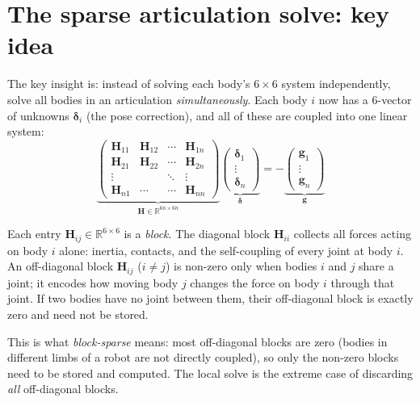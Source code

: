 \documentclass[11pt,a4paper]{article}
\begin{document}
\section{The sparse articulation solve: key idea}

The key insight is: instead of solving each body's $6\times 6$ system
independently, solve all bodies in an articulation \emph{simultaneously}.
Each body $i$ now has a $6$-vector of unknowns $\boldsymbol{\delta}_i$
(the pose correction), and all of these are coupled into one linear system:
\begin{equation}
  \underbrace{\begin{pmatrix}
    \mathbf{H}_{11} & \mathbf{H}_{12} & \cdots & \mathbf{H}_{1n} \\
    \mathbf{H}_{21} & \mathbf{H}_{22} & \cdots & \mathbf{H}_{2n} \\
    \vdots          &                 & \ddots & \vdots          \\
    \mathbf{H}_{n1} & \cdots          & \cdots & \mathbf{H}_{nn}
  \end{pmatrix}}_{\mathbf{H} \in \mathbb{R}^{6n \times 6n}}
  \underbrace{\begin{pmatrix} \boldsymbol{\delta}_1 \\ \vdots \\
  \boldsymbol{\delta}_n \end{pmatrix}}_{\boldsymbol{\delta}}
  =
  -\underbrace{\begin{pmatrix} \mathbf{g}_1 \\ \vdots \\
  \mathbf{g}_n \end{pmatrix}}_{\mathbf{g}}
  \label{eq:coupled}
\end{equation}

Each entry $\mathbf{H}_{ij} \in \mathbb{R}^{6\times 6}$ is a \emph{block}.
The diagonal block $\mathbf{H}_{ii}$ collects all forces acting on body $i$
alone: inertia, contacts, and the self-coupling of every joint at body $i$.
An off-diagonal block $\mathbf{H}_{ij}$ ($i \neq j$) is non-zero only when
bodies $i$ and $j$ share a joint; it encodes how moving body $j$ changes the
force on body $i$ through that joint.  If two bodies have no joint between
them, their off-diagonal block is exactly zero and need not be stored.

This is what \emph{block-sparse} means: most off-diagonal blocks are zero
(bodies in different limbs of a robot are not directly coupled), so only the
non-zero blocks need to be stored and computed.  The local solve is the
extreme case of discarding \emph{all} off-diagonal blocks.
\end{document}
